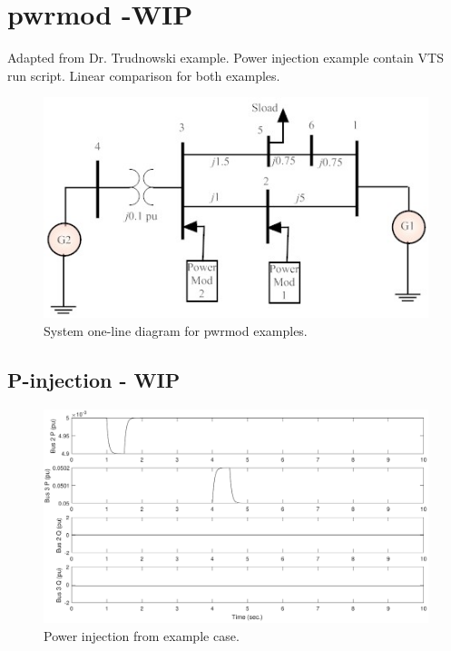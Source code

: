 \section{pwrmod -WIP} \label{sec: pwrmodExamples}
Adapted from Dr. Trudnowski example.
Power injection example contain VTS run script.
Linear comparison for both examples.
\begin{figure}[H]
	\centering
	\footnotesize
	\includegraphics[width=.85\linewidth]{examples/pwrmod/SystemOneline}
	\caption{System one-line diagram for pwrmod examples.}
	\label{fig: pwr oneline}
\end{figure}%

\pagebreak
\subsection{P-injection - WIP}
\begin{figure}[H]
	\centering
	\footnotesize
	\includegraphics[width=.85\linewidth]{examples/pwrmod/pwr-p-pert}
	\caption{Power injection from example case.}
	\label{fig: pwr p pert}
\end{figure}%

